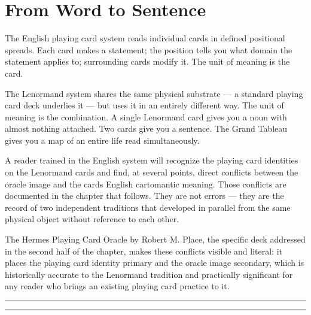 \section{From Word to Sentence}\label{between-chapters-three-and-four}

The English playing card system reads individual cards in defined positional spreads. Each card makes a statement; the position tells you what domain the statement applies to; surrounding cards modify it. The unit of meaning is the card.

The Lenormand system shares the same physical substrate --- a standard playing card deck underlies it --- but uses it in an entirely different way. The unit of meaning is the combination. A single Lenormand card gives you a noun with almost nothing attached. Two cards give you a sentence. The Grand Tableau gives you a map of an entire life read simultaneously.

A reader trained in the English system will recognize the playing card identities on the Lenormand cards and find, at several points, direct conflicts between the oracle image and the card\textquotesingle s English cartomantic meaning. Those conflicts are documented in the chapter that follows. They are not errors --- they are the record of two independent traditions that developed in parallel from the same physical object without reference to each other.

The Hermes Playing Card Oracle by Robert M. Place, the specific deck addressed in the second half of the chapter, makes these conflicts visible and literal: it places the playing card identity primary and the oracle image secondary, which is historically accurate to the Lenormand tradition and practically significant for any reader who brings an existing playing card practice to it.

\begin{center}\rule{0.5\linewidth}{0.5pt}\end{center}

\begin{center}\rule{0.5\linewidth}{0.5pt}\end{center}
